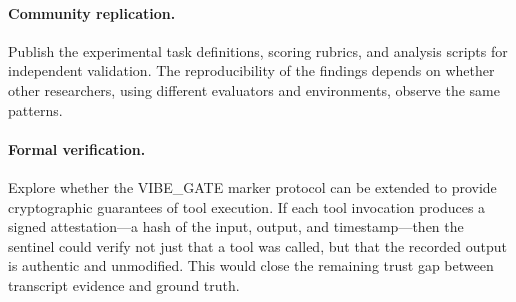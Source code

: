 \paragraph{Community replication.}
Publish the experimental task definitions, scoring rubrics, and analysis scripts for independent validation.
The reproducibility of the findings depends on whether other researchers, using different evaluators and environments, observe the same patterns.

\paragraph{Formal verification.}
Explore whether the VIBE\_GATE marker protocol can be extended to provide cryptographic guarantees of tool execution.
If each tool invocation produces a signed attestation---a hash of the input, output, and timestamp---then the sentinel could verify not just that a tool was called, but that the recorded output is authentic and unmodified.
This would close the remaining trust gap between transcript evidence and ground truth.

